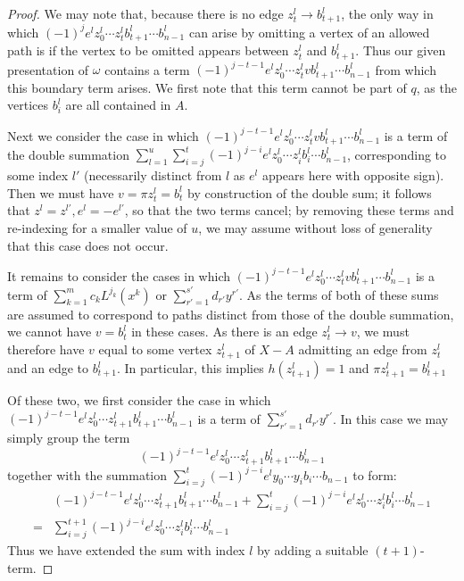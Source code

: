 \documentclass[11pt]{article}
\theoremstyle{definition}
\numberwithin{equation}{section}
\begin{document}
\begin{proof}
We may note that, because there is no edge $z^l_t \to b^l_{t+1}$, the only way in which $(-1)^{j} e^l z^l_0 \cdots z^l_t b^l_{t+1} \cdots b^l_{n-1}$ can arise by omitting a vertex of an allowed path is if the vertex to be omitted appears between $z^l_t$ and $b^l_{t+1}$. Thus our given presentation of $\omega$ contains a term $(-1)^{j-t-1} e^l z^l_0 \cdots z^l_t v b^l_{t+1} \cdots b^l_{n-1}$ from which this boundary term arises. We first note that this term cannot be part of $q$, as the vertices $b^l_i$ are all contained in $A$.

Next we consider the case in which $(-1)^{j-t-1} e^l z^l_0 \cdots z^l_t v b^l_{t+1} \cdots b^l_{n-1}$ is a term of the double summation $\sum_{l = 1}^{u} \sum_{i = j}^{t} (-1)^{j-i} e^l z^l_0 \cdots z^l_i b^l_i \cdots b^l_{n-1}$, corresponding to some index $l'$ (necessarily distinct from $l$ as $e^l$ appears here with opposite sign). Then we must have $v = \pi z^l_t = b^l_t$ by construction of the double sum; it follows that $z^l = z^{l'}, e^l = -e^{l'}$, so that the two terms cancel; by removing these terms and re-indexing for a smaller value of $u$, we may assume without loss of generality that this case does not occur.

It remains to consider the cases in which $(-1)^{j-t-1} e^l z^l_0 \cdots z^l_t v b^l_{t+1} \cdots b^l_{n-1}$ is a term of  $\sum_{k=1}^m c_k L^{j_k}(x^k)$ or $\sum_{r' = 1}^{s'} d_{r'} y^{r'}$. As the terms of both of these sums are assumed to correspond to paths distinct from those of the double summation, we cannot have $v = b^l_t$ in these cases. As there is an edge $z^l_t \to v$, we must therefore have $v$ equal to some vertex $z^l_{t+1}$ of $X - A$ admitting an edge from $z^l_t$ and an edge to $b^l_{t+1}$. In particular, this implies $h(z^l_{t+1}) = 1$ and $\pi z^l_{t+1} = b^l_{t+1}$

Of these two, we first consider the case in which $(-1)^{j-t-1} e^l z^l_0 \cdots z^l_{t+1} b^l_{t+1} \cdots b^l_{n-1}$ is a term of $\sum_{r' = 1}^{s'} d_{r'} y^{r'}$. In this case we may simply group the term 
\[(-1)^{j-t-1} e^l z^l_0 \cdots z^l_{t+1} b^l_{t+1} \cdots b^l_{n-1}\]
together with the summation $\sum_{i = j}^{t} (-1)^{j-i} e^l y_0 \cdots y_i b_i \cdots b_{n-1}$ to form: 
\begin{align*}
& (-1)^{j-t-1} e^l z^l_0 \cdots z^l_{t+1} b^l_{t+1} \cdots b^l_{n-1} + \sum_{i = j}^{t} (-1)^{j-i} e^l z^l_0 \cdots z^l_i b^l_i \cdots b^l_{n-1} \\
= & \sum_{i = j}^{t+1} (-1)^{j-i} e^l z^l_0 \cdots z^l_i b^l_i \cdots b^l_{n-1}
\end{align*}
Thus we have extended the sum with index $l$ by adding a suitable $(t+1)$-term.


\end{proof}
\end{document}
